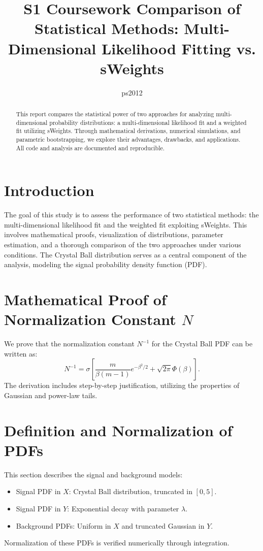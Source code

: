 \documentclass[12pt,a4paper]{article}
\title{S1 Coursework Comparison of Statistical Methods: Multi-Dimensional Likelihood Fitting vs. sWeights}
\author{ps2012}
\begin{document}
\maketitle
\begin{abstract}
This report compares the statistical power of two approaches for analyzing multi-dimensional probability distributions: a multi-dimensional likelihood fit and a weighted fit utilizing sWeights. Through mathematical derivations, numerical simulations, and parametric bootstrapping, we explore their advantages, drawbacks, and applications. All code and analysis are documented and reproducible.
\end{abstract}

\tableofcontents

\section{Introduction}
The goal of this study is to assess the performance of two statistical methods: the multi-dimensional likelihood fit and the weighted fit exploiting sWeights. This involves mathematical proofs, visualization of distributions, parameter estimation, and a thorough comparison of the two approaches under various conditions. The Crystal Ball distribution serves as a central component of the analysis, modeling the signal probability density function (PDF).

\section{Mathematical Proof of Normalization Constant \texorpdfstring{$N$}{N}}
\label{sec:proof}
We prove that the normalization constant $N^{-1}$ for the Crystal Ball PDF can be written as:
\begin{equation}
N^{-1} = \sigma \left[ \frac{m}{\beta(m-1)} e^{-\beta^2/2} + \sqrt{2\pi} \Phi(\beta) \right].
\end{equation}
The derivation includes step-by-step justification, utilizing the properties of Gaussian and power-law tails.

\section{Definition and Normalization of PDFs}
\label{sec:pdfs}
This section describes the signal and background models:
\begin{itemize}
    \item Signal PDF in $X$: Crystal Ball distribution, truncated in $[0,5]$.
    \item Signal PDF in $Y$: Exponential decay with parameter $\lambda$.
    \item Background PDFs: Uniform in $X$ and truncated Gaussian in $Y$.
\end{itemize}
Normalization of these PDFs is verified numerically through integration.
\end{document}
